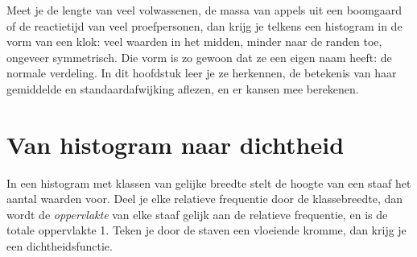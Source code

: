 %



Meet je de lengte van veel volwassenen, de massa van appels uit een boomgaard of de reactietijd van veel proefpersonen, dan krijg je telkens een histogram in de vorm van een klok: veel waarden in het midden, minder naar de randen toe, ongeveer symmetrisch. Die vorm is zo gewoon dat ze een eigen naam heeft: de normale verdeling. In dit hoofdstuk leer je ze herkennen, de betekenis van haar gemiddelde en standaardafwijking aflezen, en er kansen mee berekenen.

\begin{oefeningen}[Start]

\end{oefeningen}


\section{Van histogram naar dichtheid}

In een histogram met klassen van gelijke breedte stelt de hoogte van een staaf het aantal waarden voor. Deel je elke relatieve frequentie door de klassebreedte, dan wordt de \textit{oppervlakte} van elke staaf gelijk aan de relatieve frequentie, en is de totale oppervlakte 1. Teken je door de staven een vloeiende kromme, dan krijg je een dichtheidsfunctie.

